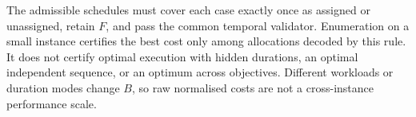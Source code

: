 The admissible schedules must cover each case exactly once as assigned or
unassigned, retain $F$, and pass the common temporal validator. Enumeration
on a small instance certifies the best cost only among allocations decoded
by this rule. It does not certify optimal execution with hidden durations,
an optimal independent sequence, or an optimum across objectives. Different
workloads or duration modes change $B$, so raw normalised costs are not a
cross-instance performance scale.
